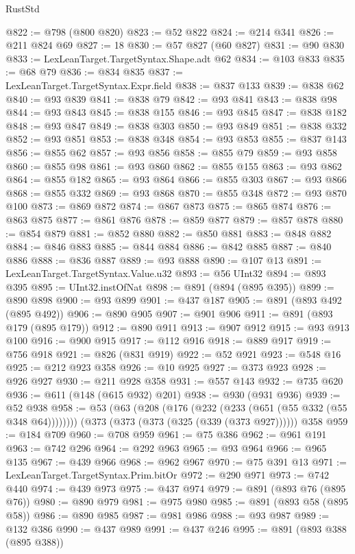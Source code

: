 \begin{lexlean}{RustStd}
\begin{coremodule}
@822 := @798 (@800 @820)
@823 := @52 @822
@824 := @214 @341
@826 := @211 @824 @69
@827 := 18
@830 := @57 @827 (@60 @827)
@831 := @90 @830
@833 := LexLeanTarget.TargetSyntax.Shape.adt @62
@834 := @103 @833
@835 := @68 @79
@836 := @834 @835
@837 := LexLeanTarget.TargetSyntax.Expr.field
@838 := @837 @133
@839 := @838 @62
@840 := @93 @839
@841 := @838 @79
@842 := @93 @841
@843 := @838 @98
@844 := @93 @843
@845 := @838 @155
@846 := @93 @845
@847 := @838 @182
@848 := @93 @847
@849 := @838 @303
@850 := @93 @849
@851 := @838 @332
@852 := @93 @851
@853 := @838 @348
@854 := @93 @853
@855 := @837 @143
@856 := @855 @62
@857 := @93 @856
@858 := @855 @79
@859 := @93 @858
@860 := @855 @98
@861 := @93 @860
@862 := @855 @155
@863 := @93 @862
@864 := @855 @182
@865 := @93 @864
@866 := @855 @303
@867 := @93 @866
@868 := @855 @332
@869 := @93 @868
@870 := @855 @348
@872 := @93 @870 @100
@873 := @869 @872
@874 := @867 @873
@875 := @865 @874
@876 := @863 @875
@877 := @861 @876
@878 := @859 @877
@879 := @857 @878
@880 := @854 @879
@881 := @852 @880
@882 := @850 @881
@883 := @848 @882
@884 := @846 @883
@885 := @844 @884
@886 := @842 @885
@887 := @840 @886
@888 := @836 @887
@889 := @93 @888
@890 := @107 @13
@891 := LexLeanTarget.TargetSyntax.Value.u32
@893 := @56 UInt32
@894 := @893 @395
@895 := UInt32.instOfNat
@898 := @891 (@894 (@895 @395))
@899 := @890 @898
@900 := @93 @899
@901 := @437 @187
@905 := @891 (@893 @492 (@895 @492))
@906 := @890 @905
@907 := @901 @906
@911 := @891 (@893 @179 (@895 @179))
@912 := @890 @911
@913 := @907 @912
@915 := @93 @913 @100
@916 := @900 @915
@917 := @112 @916
@918 := @889 @917
@919 := @756 @918
@921 := @826 (@831 @919)
@922 := @52 @921
@923 := @548 @16
@925 := @212 @923 @358
@926 := @10 @925
@927 := @373 @923
@928 := @926 @927
@930 := @211 @928 @358
@931 := @557 @143
@932 := @735 @620
@936 := @611 (@148 (@615 @932) @201)
@938 := @930 (@931 @936)
@939 := @52 @938
@958 := @53
    (@63 (@208 (@176 (@232 (@233 (@651 (@55 @332 (@55 @348 @64))))))))
    (@373 (@373 (@373 (@325 (@339 (@373 @927))))))
    @358
@959 := @184 @709
@960 := @708 @959
@961 := @75 @386
@962 := @961 @191
@963 := @742 @296
@964 := @292 @963
@965 := @93 @964
@966 := @965 @135
@967 := @439 @966
@968 := @962 @967
@970 := @75 @391 @13
@971 := LexLeanTarget.TargetSyntax.Prim.bitOr
@972 := @290 @971
@973 := @742 @440
@974 := @439 @973
@975 := @437 @974
@979 := @891 (@893 @76 (@895 @76))
@980 := @890 @979
@981 := @975 @980
@985 := @891 (@893 @58 (@895 @58))
@986 := @890 @985
@987 := @981 @986
@988 := @93 @987
@989 := @132 @386
@990 := @437 @989
@991 := @437 @246
@995 := @891 (@893 @388 (@895 @388))

\end{coremodule}
\end{lexlean}
